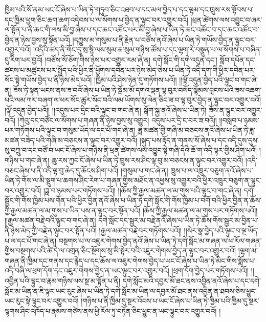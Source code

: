 ཁྱིམ་པའི་སོ་ནམ་ཡང་ངོ་ཞེས་པ་ཡིན་ཏེ་གཏུབ་ཅིང་འཐབ་པ་དང་མལ་བྱེད་པ་དང་ལྷམ་དང་ཁྲུས་རས་སྟོབས་པ་དང་ཁྱིམ་ཕྱག་ཅིང་ཆག་ཆག་འདེབས་པ་ལ་སོགས་པ་བྱེད་ན་ལྟུང་བར་འགྱུར་བའོ། །ཕྲན་ཚེགས་ལས་འབྱུང་བ་ཞར་ལ་སྟོན་པ་ནི་ཆང་གི་ལས་མི་བྱ་ཞེས་པ་དང་ཆང་འཚོང་པར་མི་བྱ་ཞེས་པ་ཡིན་ཏེ་ཆང་འཚོང་བ་དང་ཆང་འཚོང་བ་བྱེད་ན་ཉེས་བྱས་སུ་སྟོན་པའོ། །དཀྱུས་མ་གསུམ་པ་ནི་རྗེན་པ་བཙོས་ནའོ་ཞེས་པ་ཡིན་ཏེ་གཡོས་བྱེད་ན་ལྟུང་བར་འགྱུར་བའོ། །འདིའི་ཚད་ནི་གོང་དུ་སྲ་སྙི་ལས་སུམ་ཆ་སུམ་གཉིས་ཚོས་པ་དང་ལྷག་རེ་བསྣུན་པ་ལ་སོགས་པ་བཞིན་དུ་རིག་པར་བྱའོ། །བཙོས་སོ་ཅོག་གིས་ཉེས་པར་འགྱུར་རམ་ཞེ་ན། དགེ་སློང་གི་དགེ་འདུན་དང་། སློབ་དཔོན་དང་ཚངས་པ་མཚུངས་པར་སྤྱོད་པའི་ཕྱིར་ནི་ཕྱོགས་དབེན་པར་ཉེས་མེད་ཅེས་པ་ཡིན་ཏེ་འདི་དག་གི་ཕྱིར་དབེན་པར་སོང་སྟེ་གཡོས་བྱེད་པ་ནི་ཉེས་མེད་པའོ། །ཁྱིམ་པའི་ཤེས་ཉེན་དུ་གཏོགས་པའོ།། །།ལྟོ་འདུན་བྱེད་པའི་ལྟུང་བ་གང་ཞེ་ན། ཟོས་ཏེ་སྟན་ཡངས་ནས་ཟ་བའོ་ཞེས་པ་ཡིན་ཏེ་སྦོམ་མོ་དགའ་ལྡན་ལྟ་བུར་བསོད་སྙོམས་བླངས་པའི་ཟས་འཆག་པའི་ལམ་ཀར་བཞག་ལ་ཕར་སོང་ཚུར་སོང་བའི་ལམ་ཡོགས་སུ་ལེན་ཅིང་ཟ་བ་ལྟ་བུར་བྱེད་ན་ལྟུང་བར་འགྱུར་བའོ། །ལྟོ་འདུན་བྱེད་པའོ།། །།འདུས་པར་དྲིང་བའི་ལྟུང་བ་གང་ཞེ་ན། སྒོག་སྐྱ་ནའོ་ཞེས་པ་ཡིན་ཏེ། ཟོས་ན་ལྟུང་བར་འགྱུར་བའོ། །ཀེའུ་དང་བཙོང་ལ་སོགས་པ་གཞན་ནི་ཉེས་བྱས་སུ་འགྱུར། འདུས་པར་དྲི་ང་བར་ཟ་བའོ།། །།བསླབ་པ་ཉམས་པར་གཏོགས་པའི་ལྟུང་བ་གསུམ་ཡོད་ལ་དང་པོ་གང་ཞེ་ན། ཟླ་མཚན་གྱི་གཞི་མ་བཅངས་ནའོ་ཞེས་པ་ཡིན་ཏེ་ཟླ་མཚན་བཟེད་པའི་གཞི་མ་བཅངས་ན་ལྟུང་བར་འགྱུར་བའོ། །སྐུད་པས་རྟོད་ན་གནས་སོ་ཞེས་པ་དང་འདི་དུས་དུས་སུ་བཀྲུ་བ་དང་བཙོ་བ་ཡང་ངོ་ཞེས་པ་གཉིས་ནི་ཕྲན་ཚེགས་ལས་འབྱུང་སྟེ་གཞི་དེའི་ཆོ་ག་འདི་ལྟར་གྱིས་ཤིག་པའོ། །གཉིས་པ་གང་ཞེ་ན། ཆུ་རས་ཀྱང་ངོ་ཞེས་པ་ཡིན་ཏེ་ཁྲུས་རས་ཤིང་ལྟ་བུ་མ་བཅངས་ན་ལྟུང་བར་འགྱུར་བའོ། །འདི་བཅང་ཞེས་པ་ནི་འདི་ལྟ་བུ་ཆེད་དུ་ཆོངས་ཤིག་པའོ། །གསུམ་པ་གང་ཞེ་ན། ཁྲུས་པ་ལ་འཁྲུར་བཅུག་ནའོ་ཞེས་པ་ཡིན་ཏེ་གོས་ལ་མི་སྡུག་པ་ཆགས་ཤིང་རེག་པ་གཞན་གྱིས་མཐོང་ན་འཕྱས་སུ་འགྱུར་བའི་ཕྱིར་འཁྲུར་བཅུག་ན་ལྟུང་བར་འགྱུར་བའོ། །ཟླ་བ་ཉམས་པར་གཏོགས་པའོ།། །།ཆོས་ཀྱི་རྒྱལ་མཚན་ལ་མ་གུས་པའི་ལྟུང་བ་གང་ཞེ་ན། དགེ་སྦྱོང་གི་གོས་ཁྱིམ་པས་གོན་པའི་ཕྱིར་བྱིན་ནའོ་ཞེས་པ་ཡིན་ཏེ་དགེ་སློང་གི་གོས་ཁྱིམ་པ་བགོ་བའི་ཕྱིར་བྱིན་ན་ཆོས་ཀྱི་རྒྱལ་མཚན་ལ་མ་གུས་པ་ཡིན་པས་ན་ལྟུང་བར་སྟོན་པའོ། །ཆོས་ཀྱི་རྒྱལ་མཚན་ལ་མ་གུས་པར་གཏོགས་པའོ།། །།རྒྱལ་མཚན་བརྗེ་བའི་ལྟུང་བ་གང་ཞེ་ན། དགེ་སློང་དང་སྦྱར་མ་བརྗེ་ནའོ་ཞེས་པ་ཡིན་ཏེ་ཆོས་གོས་སྦྱར་མ་བྱིན་པ་ནི་ཉེས་མེད་ཀྱི་བརྗེ་ན་ལྟུང་བར་སྟོན་པའོ། །རྒྱལ་མཚན་བརྗེ་བར་གཏོགས་པའོ།། །།སེར་སྣ་བྱེད་པའི་ལྟུང་བ་ལྔ་ཡོད་པ་ལ་དང་པོ་གང་ཞེ་ན། བསྔགས་པ་ལ་འཇུར་གེགས་བྱེད་ནའོ་ཞེས་པ་ཡིན་ཏེ་དགེ་སློང་མ་གཞན་ལ་ཕ་རོལ་གཞན་གྱིས་བསྔགས་པའི་ཚེ་དེ་ལ་འགྲན་ཅིང་སྔོགས་སུ་མི་སྟེར་བའི་འཇུར་གེགས་བྱེད་ན་ལྟུང་བར་འགྱུར་བའོ། །ལྷག་མ་གཞན་ནི་ཁྱིམ་དང་གནས་དང་རྙེད་པ་དང་ཆོས་ལ་འཇུར་གེགས་བྱེད་པ་ཡང་ངོ་ཞེས་པ་ཡིན་ཏེ་མིང་གིས་སྨོས་པ་འདི་བཞི་ལ་ཕྲག་དོག་དང་འཇུར་གེགས་བྱེད་ན་ཡང་ལྟུང་བར་འགྱུར་བའོ། །ཕྲག་དོག་བྱེད་པར་གཏོགས་པའོ།། །།འབྱིན་པའི་ལྟུང་བ་རྣམ་གཉིས་ལས་སྔ་མ་སྟོན་པ་ནི། དགེ་སློང་མའི་དབྱར་མོ་ཐང་ནས་འབྱིན་ནའོ་ཞེས་པ་དང་དགེ་སློང་མ་ཡིན་ན་ཇི་ལྟར་ཡང་རུང་ཞེས་པ་ཡིན་ཏེ་དགེ་སློང་མ་ཡིན་ལ་དབྱར་མོ་ཐང་ནས་འབྱིན་ན་ཐབས་ཅིས་ཕྱུང་ཡང་རུང་སྟེ་ལྟུང་བར་འགྱུར་བའོ། །གཉིས་པ་ནི་ཁྱིམ་དུ་སྔར་འོངས་པ་ཡང་ངོ་ཞེས་པ་ཡིན་ཏེ་ཁྱིམ་པའི་ཁྱིམ་དུ་སྔར་ལྷགས་ཤིང་འཁོད་པ་རྣམས་གཙེས་ནས་ཕྱི་རོལ་ཏུ་བཏོན་ཅིང་ཕྱུང་ན་ཡང་ལྟུང་བར་འགྱུར་བའོ། །
